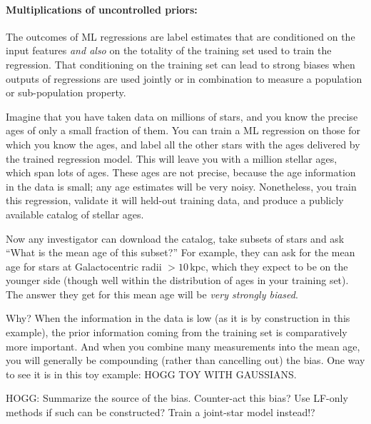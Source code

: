 \documentclass[11pt]{article}
\begin{document}
\paragraph{Multiplications of uncontrolled priors:}
The outcomes of ML regressions are label estimates that are conditioned on the input features \emph{and also} on the totality of the training set used to train the regression.
That conditioning on the training set can lead to strong biases when outputs of regressions are used jointly or in combination to measure a population or sub-population property.

Imagine that you have taken data on millions of stars, and you know the precise ages of only a small fraction of them.
You can train a ML regression on those for which you know the ages, and label all the other stars with the ages delivered by the trained regression model.
This will leave you with a million stellar ages, which span lots of ages.
These ages are not precise, because the age information in the data is small; any age estimates will be very noisy.
Nonetheless, you train this regression, validate it will held-out training data, and produce a publicly available catalog of stellar ages.

Now any investigator can download the catalog, take subsets of stars and ask ``What is the mean age of this subset?''
For example, they can ask for the mean age for stars at Galactocentric radii $>10$\,kpc, which they expect to be on the younger side (though well within the distribution of ages in your training set).
The answer they get for this mean age will be \emph{very strongly biased}.

Why? When the information in the data is low (as it is by construction in this example), the prior information coming from the training set is comparatively more important.
And when you combine many measurements into the mean age, you will generally be compounding (rather than cancelling out) the bias.
One way to see it is in this toy example: HOGG TOY WITH GAUSSIANS.

HOGG: Summarize the source of the bias. Counter-act this bias? Use LF-only methods if such can be constructed? Train a joint-star model instead!?
\end{document}
